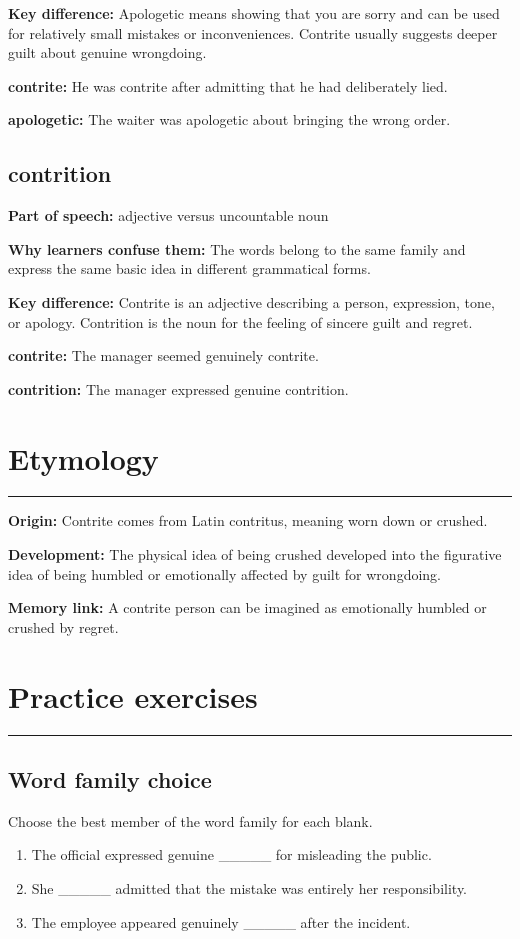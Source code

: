 \documentclass[11pt]{article}
\newcommand{\sectionrule}{\par\vspace{-0.5em}\noindent\textcolor{Accent}{\rule{\linewidth}{0.6pt}}\par}
\begin{document}
\textbf{Key difference:} Apologetic means showing that you are sorry and can be used for relatively small mistakes or inconveniences. Contrite usually suggests deeper guilt about genuine wrongdoing.

\textbf{contrite:} He was contrite after admitting that he had deliberately lied.

\textbf{apologetic:} The waiter was apologetic about bringing the wrong order.

\subsection{contrition}
\textbf{Part of speech:} adjective versus uncountable noun

\textbf{Why learners confuse them:} The words belong to the same family and express the same basic idea in different grammatical forms.

\textbf{Key difference:} Contrite is an adjective describing a person, expression, tone, or apology. Contrition is the noun for the feeling of sincere guilt and regret.

\textbf{contrite:} The manager seemed genuinely contrite.

\textbf{contrition:} The manager expressed genuine contrition.

\section{Etymology}
\sectionrule
\textbf{Origin:} Contrite comes from Latin contritus, meaning worn down or crushed.

\textbf{Development:} The physical idea of being crushed developed into the figurative idea of being humbled or emotionally affected by guilt for wrongdoing.

\textbf{Memory link:} A contrite person can be imagined as emotionally humbled or crushed by regret.

\section{Practice exercises}
\sectionrule
\subsection{Word family choice}
Choose the best member of the word family for each blank.

\begin{enumerate}
  \item The official expressed genuine \_\_\_\_\_ for misleading the public.
  \item She \_\_\_\_\_ admitted that the mistake was entirely her responsibility.
  \item The employee appeared genuinely \_\_\_\_\_ after the incident.
\end{enumerate}
\end{document}
